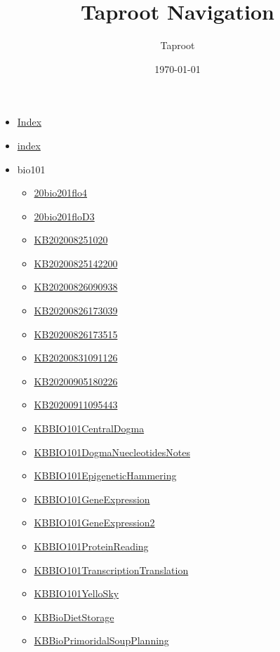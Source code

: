 \documentclass[11pt]{article}
\author{Taproot}
\date{\today}
\title{Taproot Navigation}
\begin{document}
\maketitle
\tableofcontents

\begin{itemize}
\item \href{theindex.org}{Index}
\item \href{index.org}{index}
\item bio101
\begin{itemize}
\item \href{bio101/20bio201flo4.org}{20bio201flo4}
\item \href{bio101/20bio201floD3.org}{20bio201floD3}
\item \href{bio101/KB202008251020.org}{KB202008251020}
\item \href{bio101/KB20200825142200.org}{KB20200825142200}
\item \href{bio101/KB20200826090938.org}{KB20200826090938}
\item \href{bio101/KB20200826173039.org}{KB20200826173039}
\item \href{bio101/KB20200826173515.org}{KB20200826173515}
\item \href{bio101/KB20200831091126.org}{KB20200831091126}
\item \href{bio101/KB20200905180226.org}{KB20200905180226}
\item \href{bio101/KB20200911095443.org}{KB20200911095443}
\item \href{bio101/KBBIO101CentralDogma.org}{KBBIO101CentralDogma}
\item \href{bio101/KBBIO101DogmaNuecleotidesNotes.org}{KBBIO101DogmaNuecleotidesNotes}
\item \href{bio101/KBBIO101EpigeneticHammering.org}{KBBIO101EpigeneticHammering}
\item \href{bio101/KBBIO101GeneExpression.org}{KBBIO101GeneExpression}
\item \href{bio101/KBBIO101GeneExpression2.org}{KBBIO101GeneExpression2}
\item \href{bio101/KBBIO101ProteinReading.org}{KBBIO101ProteinReading}
\item \href{bio101/KBBIO101TranscriptionTranslation.org}{KBBIO101TranscriptionTranslation}
\item \href{bio101/KBBIO101YelloSky.org}{KBBIO101YelloSky}
\item \href{bio101/KBBioDietStorage.org}{KBBioDietStorage}
\item \href{bio101/KBBioPrimoridalSoupPlanning.org}{KBBioPrimoridalSoupPlanning}

\end{itemize}
\end{itemize}
\end{document}
